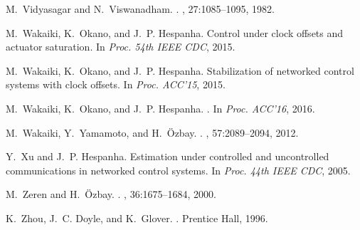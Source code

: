 \documentclass[letterpaper, 12pt, draftcls, onecolumn]{ieeeconf}
\begin{document}
\begin{thebibliography}{10}
	M.~Vidyasagar and N.~Viswanadham.
	.
	, 27:1085--1095, 1982.
	
	M.~Wakaiki, K.~Okano, and J.~P. Hespanha.
	\newblock Control under clock offsets and actuator saturation.
	\newblock In {\em Proc. 54th IEEE CDC}, 2015.
	
	M.~Wakaiki, K.~Okano, and J.~P. Hespanha.
	\newblock Stabilization of networked control systems with clock offsets.
	\newblock In {\em Proc. ACC'15}, 2015.
	
	M.~Wakaiki, K.~Okano, and J.~P. Hespanha.
	.
	\newblock In {\em Proc. ACC'16}, 2016.
	
	M.~Wakaiki, Y.~Yamamoto, and H.~\"Ozbay.
	.
	, 57:2089--2094, 2012.
	
	Y.~Xu and J.~P. Hespanha.
	\newblock Estimation under controlled and uncontrolled communications in
	networked control systems.
	\newblock In {\em Proc. 44th IEEE CDC}, 2005.
	
	M.~Zeren and H.~\"Ozbay.
	.
	, 36:1675--1684, 2000.
	
	K.~Zhou, J.~C. Doyle, and K.~Glover.
	.
	\newblock Prentice Hall, 1996.
	
\end{thebibliography}
\end{document}
